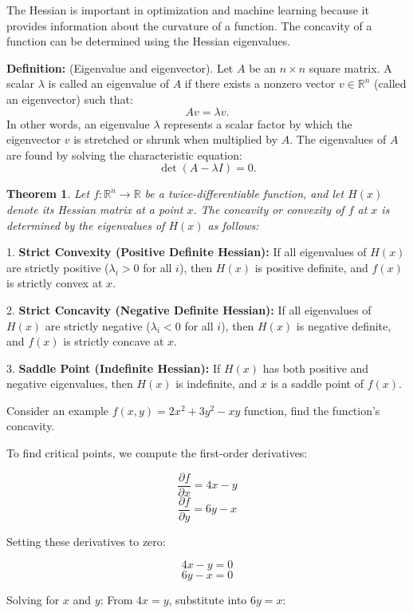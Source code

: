 \documentclass[12pt]{article}
\newtheorem{theorem}{Theorem}
\theoremstyle{definition}
\begin{document}
The Hessian is important in optimization and machine learning because it provides information about the curvature of a function. The concavity of a function can be determined using the Hessian eigenvalues.

\textbf{Definition:} (Eigenvalue and eigenvector). 
Let \( A \) be an \( n \times n \) square matrix. A scalar \( \lambda \) is called an eigenvalue of \( A \) if there exists a nonzero vector \( v \in \mathbb{R}^n \) (called an eigenvector) such that:  
\[
A v = \lambda v.
\]  
In other words, an eigenvalue \( \lambda \) represents a scalar factor by which the eigenvector \( v \) is stretched or shrunk when multiplied by \( A \). The eigenvalues of \( A \) are found by solving the characteristic equation:  
\[
\det(A - \lambda I) = 0.
\]  


\begin{theorem}
Let \( f: \mathbb{R}^n \to \mathbb{R} \) be a twice-differentiable function, and let \( H(x) \) denote its Hessian matrix at a point \( x \). The concavity or convexity of \( f \) at \( x \) is determined by the eigenvalues of \( H(x) \) as follows:  
\end{theorem}

1. \textbf{Strict Convexity (Positive Definite Hessian):}  
   If all eigenvalues of \( H(x) \) are strictly positive (\(\lambda_i > 0\) for all \( i \)), then \( H(x) \) is positive definite, and \( f(x) \) is strictly convex at \( x \).  

2. \textbf{Strict Concavity (Negative Definite Hessian):}  
   If all eigenvalues of \( H(x) \) are strictly negative (\(\lambda_i < 0\) for all \( i \)), then \( H(x) \) is negative definite, and \( f(x) \) is strictly concave at \( x \).  

3. \textbf{Saddle Point (Indefinite Hessian):}  
   If \( H(x) \) has both positive and negative eigenvalues, then \( H(x) \) is indefinite, and \( x \) is a saddle point of \( f(x) \).  

Consider an example $f(x,y) = 2x^2 + 3y^2 - xy$ function, find the function's concavity.

To find critical points, we compute the first-order derivatives:

\[
\frac{\partial f}{\partial x} = 4x - y
\]
\[
\frac{\partial f}{\partial y} = 6y - x
\]

Setting these derivatives to zero:

\[
4x - y = 0
\]
\[
6y - x = 0
\]

Solving for \( x \) and \( y \):  
From \( 4x = y \), substitute into \( 6y = x \):
\end{document}
